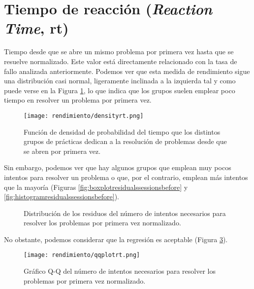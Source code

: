 \section{Tiempo de reacción (\emph{Reaction Time}, rt)}

Tiempo desde que se abre un mismo problema por primera vez hasta que se resuelve normalizado. Este valor está directamente relacionado con la tasa de fallo analizada anteriormente. Podemos ver que esta medida de rendimiento sigue una distribución casi normal, ligeramente inclinada a la izquierda tal y como puede verse en la Figura \ref{fig:densityplotrt}, lo que indica que los grupos suelen emplear poco tiempo en resolver un problema por primera vez.

\begin{figure}[H]
    \centering
    \texttt{[image: rendimiento/densityrt.png]}
    \caption{Función de densidad de probabilidad del tiempo que los distintos grupos de prácticas dedican a la resolución de problemas desde que se abren por primera vez.}
    \label{fig:densityplotrt}
\end{figure}

Sin embargo, podemos ver que hay algunos grupos que emplean muy pocos intentos para resolver un problema o que, por el contrario, emplean más intentos que la mayoría (Figuras \ref{fig:boxplotresidualssessionsbefore} y \ref{fig:histogramresidualssessionsbefore}).

\begin{figure}[H]
\centering
{}\qquad
{}
\caption{Distribución de los residuos del número de intentos necesarios para resolver los problemas por primera vez normalizado.}
\label{fig:sessionsbefore}
\end{figure}

No obstante, podemos considerar que la regresión es aceptable (Figura \ref{fig:q-qsessionsbefore}).

\begin{figure}[H]
    \centering
    \texttt{[image: rendimiento/qqplotrt.png]}
    \caption{Gráfico Q-Q del número de intentos necesarios para resolver los problemas por primera vez normalizado.}
    \label{fig:q-qsessionsbefore}
\end{figure}

